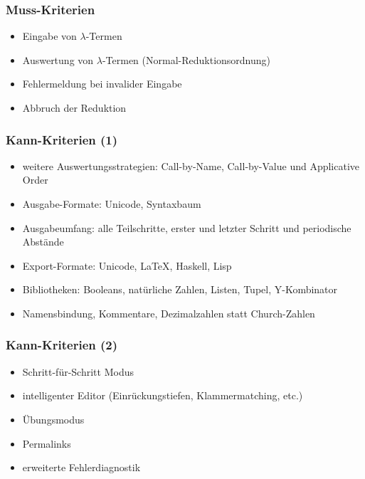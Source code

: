 \documentclass[10pt]{beamer}
\begin{document}
\begin{frame}
\frametitle{Muss-Kriterien}
\begin{itemize}
\item Eingabe von $\lambda$-Termen
\item Auswertung von $\lambda$-Termen (Normal-Reduktionsordnung)
\item Fehlermeldung bei invalider Eingabe
\item Abbruch der Reduktion
\end{itemize}
\end{frame}

\begin{frame}
\frametitle{Kann-Kriterien (1)}
\begin{itemize}
\item weitere Auswertungsstrategien: Call-by-Name, Call-by-Value und Applicative Order
\item Ausgabe-Formate: Unicode, Syntaxbaum
\item Ausgabeumfang: alle Teilschritte, erster und letzter Schritt und periodische Abstände
\item Export-Formate: Unicode, \LaTeX, Haskell, Lisp
\item Bibliotheken: Booleans, natürliche Zahlen, Listen, Tupel, Y-Kombinator
\item Namensbindung, Kommentare, Dezimalzahlen statt Church-Zahlen
\end{itemize}
\end{frame}

\begin{frame}
\frametitle{Kann-Kriterien (2)}
\begin{itemize}
\item Schritt-für-Schritt Modus
\item intelligenter Editor (Einrückungstiefen, Klammermatching, etc.)
\item Übungsmodus
\item Permalinks
\item erweiterte Fehlerdiagnostik
\end{itemize}
\end{frame}
\end{document}

